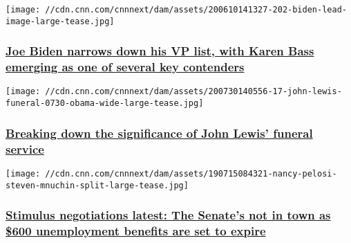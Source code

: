 \href{/2020/07/31/politics/joe-biden-running-mate/index.html}{}

\texttt{[image: //cdn.cnn.com/cnnnext/dam/assets/200610141327-202-biden-lead-image-large-tease.jpg]}

\hypertarget{joe-biden-narrows-down-his-vp-list-with-karen-bass-emerging-as-one-of-several-key-contenders-}{%
\subsubsection{\texorpdfstring{\href{/2020/07/31/politics/joe-biden-running-mate/index.html}{Joe
Biden narrows down his VP list, with Karen Bass emerging as one of
several key contenders
}}{Joe Biden narrows down his VP list, with Karen Bass emerging as one of several key contenders }}\label{joe-biden-narrows-down-his-vp-list-with-karen-bass-emerging-as-one-of-several-key-contenders-}}

\href{/2020/07/31/politics/john-lewis-atlanta-funeral-service/index.html}{}

\texttt{[image: //cdn.cnn.com/cnnnext/dam/assets/200730140556-17-john-lewis-funeral-0730-obama-wide-large-tease.jpg]}

\hypertarget{breaking-down-the-significance-of-john-lewis-funeral-service}{%
\subsubsection{\texorpdfstring{\href{/2020/07/31/politics/john-lewis-atlanta-funeral-service/index.html}{Breaking
down the significance of John Lewis' funeral
service}}{Breaking down the significance of John Lewis' funeral service}}\label{breaking-down-the-significance-of-john-lewis-funeral-service}}

\href{/2020/07/31/politics/stimulus-negotiations-state-of-play/index.html}{}

\texttt{[image: //cdn.cnn.com/cnnnext/dam/assets/190715084321-nancy-pelosi-steven-mnuchin-split-large-tease.jpg]}

\hypertarget{stimulus-negotiations-latest-the-senates-not-in-town-as-600-unemployment-benefits-are-set-to-expire}{%
\subsubsection{\texorpdfstring{\href{/2020/07/31/politics/stimulus-negotiations-state-of-play/index.html}{Stimulus
negotiations latest: The Senate's not in town as \$600 unemployment
benefits are set to
expire}}{Stimulus negotiations latest: The Senate's not in town as \$600 unemployment benefits are set to expire}}\label{stimulus-negotiations-latest-the-senates-not-in-town-as-600-unemployment-benefits-are-set-to-expire}}

